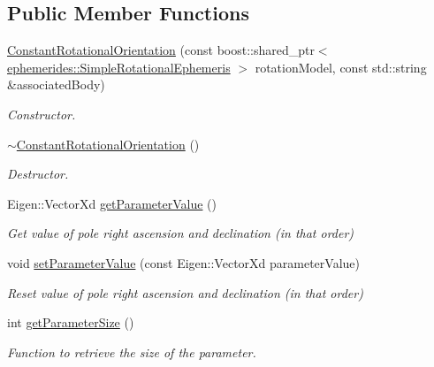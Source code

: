 \subsection*{Public Member Functions}
\begin{DoxyCompactItemize}
\item 
\hyperlink{classtudat_1_1estimatable__parameters_1_1ConstantRotationalOrientation_a8f382d9740b2400a4e4036f9dfe9f2fd}{Constant\+Rotational\+Orientation} (const boost\+::shared\+\_\+ptr$<$ \hyperlink{classtudat_1_1ephemerides_1_1SimpleRotationalEphemeris}{ephemerides\+::\+Simple\+Rotational\+Ephemeris} $>$ rotation\+Model, const std\+::string \&associated\+Body)
\begin{DoxyCompactList}\small\item\em Constructor. \end{DoxyCompactList}\item 
\hyperlink{classtudat_1_1estimatable__parameters_1_1ConstantRotationalOrientation_a7a9f5f110c6bf4d194d12303d8721256}{$\sim$\+Constant\+Rotational\+Orientation} ()\hypertarget{classtudat_1_1estimatable__parameters_1_1ConstantRotationalOrientation_a7a9f5f110c6bf4d194d12303d8721256}{}\label{classtudat_1_1estimatable__parameters_1_1ConstantRotationalOrientation_a7a9f5f110c6bf4d194d12303d8721256}

\begin{DoxyCompactList}\small\item\em Destructor. \end{DoxyCompactList}\item 
Eigen\+::\+Vector\+Xd \hyperlink{classtudat_1_1estimatable__parameters_1_1ConstantRotationalOrientation_ae5d7a223838d362632d8e1ac95833a88}{get\+Parameter\+Value} ()
\begin{DoxyCompactList}\small\item\em Get value of pole right ascension and declination (in that order) \end{DoxyCompactList}\item 
void \hyperlink{classtudat_1_1estimatable__parameters_1_1ConstantRotationalOrientation_a7bd1cbe847e0d1db60c8cd8e3f6c5943}{set\+Parameter\+Value} (const Eigen\+::\+Vector\+Xd parameter\+Value)
\begin{DoxyCompactList}\small\item\em Reset value of pole right ascension and declination (in that order) \end{DoxyCompactList}\item 
int \hyperlink{classtudat_1_1estimatable__parameters_1_1ConstantRotationalOrientation_a4222aa85e840c929eda9b6185c35d519}{get\+Parameter\+Size} ()
\begin{DoxyCompactList}\small\item\em Function to retrieve the size of the parameter. \end{DoxyCompactList}\end{DoxyCompactItemize}
